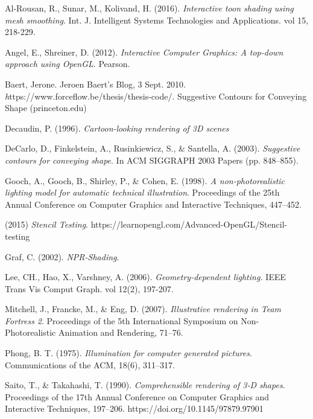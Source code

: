 \begin{thebibliography}{9}

Al-Rousan, R., Sunar, M., Kolivand, H. (2016).  \emph{Interactive toon shading using mesh smoothing}. Int. J. Intelligent Systems Technologies and Applications. vol 15, 218-229.    

Angel, E., Shreiner, D. (2012). \emph{Interactive Computer Graphics: A top-down approach using OpenGL}. Pearson.

Baert, Jerone. Jeroen Baert's Blog, 3 Sept. 2010. \emph https://www.forceflow.be/thesis/thesis-code/. Suggestive Contours for Conveying Shape (princeton.edu)

Decaudin, P. (1996). \emph{Cartoon-looking rendering of 3D scenes}

DeCarlo, D., Finkelstein, A., Rusinkiewicz, S., \& Santella, A. (2003). \emph{Suggestive contours for conveying shape}. In ACM SIGGRAPH 2003 Papers (pp. 848–855).

Gooch, A., Gooch, B., Shirley, P., \& Cohen, E. (1998). \emph{A non-photorealistic lighting model for automatic technical illustration}. Proceedings of the 25th Annual Conference on Computer Graphics and Interactive Techniques, 447–452.

(2015) \emph {Stencil Testing}. https://learnopengl.com/Advanced-OpenGL/Stencil-testing

Graf, C. (2002). \emph{NPR-Shading}.

Lee, CH., Hao, X., Varshney, A. (2006). \emph{Geometry-dependent lighting.} IEEE Trans Vis Comput Graph. vol 12(2), 197-207. 

Mitchell, J., Francke, M., \& Eng, D. (2007). \emph{Illustrative rendering in Team Fortress 2}. Proceedings of the 5th International Symposium on Non-Photorealistic Animation and Rendering, 71–76.

Phong, B. T. (1975). \emph{Illumination for computer generated pictures}. Communications of the ACM, 18(6), 311–317.

Saito, T., \& Takahashi, T. (1990). \emph{Comprehensible rendering of 3-D shapes}. Proceedings of the 17th Annual Conference on Computer Graphics and Interactive Techniques, 197–206. https://doi.org/10.1145/97879.97901
\end{thebibliography}
